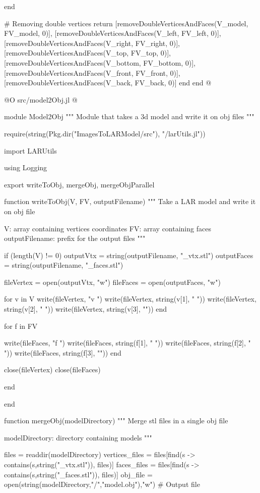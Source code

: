 \documentclass[11pt,oneside]{article}	%
\begin{document}
{  end

  # Removing double vertices
  return [removeDoubleVerticesAndFaces(V_model, FV_model, 0)],
  [removeDoubleVerticesAndFaces(V_left, FV_left, 0)],
  [removeDoubleVerticesAndFaces(V_right, FV_right, 0)],
  [removeDoubleVerticesAndFaces(V_top, FV_top, 0)],
  [removeDoubleVerticesAndFaces(V_bottom, FV_bottom, 0)],
  [removeDoubleVerticesAndFaces(V_front, FV_front, 0)],
  [removeDoubleVerticesAndFaces(V_back, FV_back, 0)]
end
end
@}


@O src/model2Obj.jl
@{module Model2Obj
"""
Module that takes a 3d model and write it on
obj files
"""

require(string(Pkg.dir("ImagesToLARModel/src"), "/larUtils.jl"))

import LARUtils

using Logging

export writeToObj, mergeObj, mergeObjParallel


function writeToObj(V, FV, outputFilename)
  """
  Take a LAR model and write it on obj file

  V: array containing vertices coordinates
  FV: array containing faces
  outputFilename: prefix for the output files
  """

  if (length(V) != 0)
    outputVtx = string(outputFilename, "_vtx.stl")
    outputFaces = string(outputFilename, "_faces.stl")

    fileVertex = open(outputVtx, "w")
    fileFaces = open(outputFaces, "w")

    for v in V
      write(fileVertex, "v ")
      write(fileVertex, string(v[1], " "))
      write(fileVertex, string(v[2], " "))
      write(fileVertex, string(v[3], "\n"))
    end

    for f in FV

      write(fileFaces, "f ")
      write(fileFaces, string(f[1], " "))
      write(fileFaces, string(f[2], " "))
      write(fileFaces, string(f[3], "\n"))
    end

    close(fileVertex)
    close(fileFaces)

  end

end

function mergeObj(modelDirectory)
  """
  Merge stl files in a single obj file

  modelDirectory: directory containing models
  """

  files = readdir(modelDirectory)
  vertices_files = files[find(s -> contains(s,string("_vtx.stl")), files)]
  faces_files = files[find(s -> contains(s,string("_faces.stl")), files)]
  obj_file = open(string(modelDirectory,"/","model.obj"),"w") # Output file

}
\end{document}
